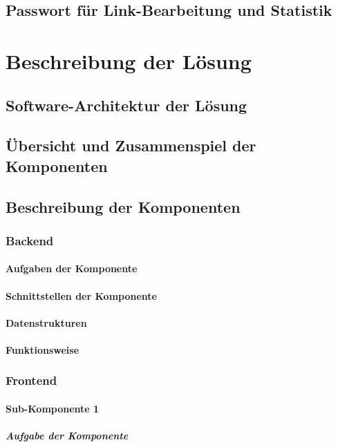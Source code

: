 \documentclass[a4paper,11pt,DIV=12,overfullrule=on]{scrreprt}
\begin{document}
\section{Passwort für Link-Bearbeitung und Statistik}


\chapter{Beschreibung der Lösung}
\section{Software-Architektur der Lösung}
\section{Übersicht und Zusammenspiel der Komponenten}
\section{Beschreibung der Komponenten}
\subsection{Backend}
\subsubsection{Aufgaben der Komponente}
\subsubsection{Schnittstellen der Komponente}
\subsubsection{Datenstrukturen}
\subsubsection{Funktionsweise}
\subsection{Frontend}
\subsubsection{Sub-Komponente 1}
\paragraph{Aufgabe der Komponente}
\end{document}
